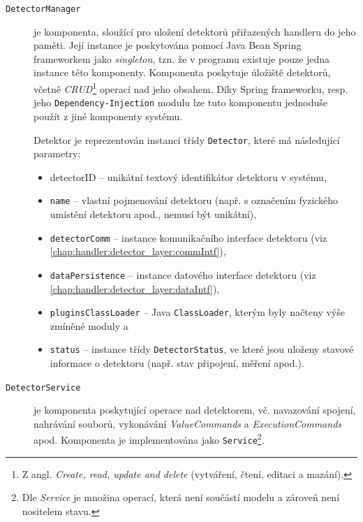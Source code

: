 \begin{description}
  \item[\texttt{DetectorManager}] je komponenta, sloužící pro uložení detektorů přiřazených handleru do jeho paměti. Její instance je poskytována pomocí Java Bean Spring frameworkem jako \textit{singleton}, tzn. že v programu existuje pouze jedna instance této komponenty. Komponenta poskytuje úložiště detektorů, včetně \textit{CRUD}\footnote{Z angl. \textit{Create, read, update and delete} (vytváření, čtení, editaci a mazání).} operací nad jeho obsahem. Díky Spring frameworku, resp. jeho \texttt{Dependency-Injection} modulu lze tuto komponentu jednoduše použít z jiné komponenty systému.
  
  Detektor je reprezentován instancí třídy \texttt{Detector}, které má následující parametry:
  \begin{itemize}
    \item \texttt{}{detectorID} -- unikátní textový identifikátor detektoru v systému,
    \item \texttt{name} -- vlastní pojmenování detektoru (např. s označením fyzického umístění detektoru apod., nemusí být unikátní),
    \item \texttt{detectorComm} -- instance komunikačního interface detektoru (viz \ref{chap:handler:detector_layer:commIntf}),
    \item \texttt{dataPersistence} -- instance datového interface detektoru (viz \ref{chap:handler:detector_layer:dataIntf}),
    \item \texttt{pluginsClassLoader} -- Java \texttt{ClassLoader}, kterým byly načteny výše zmíněné moduly a
    \item \texttt{status} -- instance třídy \texttt{DetectorStatus}, ve které jsou uloženy stavové informace o detektoru (např. stav připojení, měření apod.).
  \end{itemize}
  
  \item[\texttt{DetectorService}] je komponenta poskytující operace nad detektorem, vč. navazování spojení, nahrávání souborů, vykonávání \textit{ValueCommands} a \textit{ExecutionCommands} apod. Komponenta je implementována jako \texttt{Service}\footnote{Dle \cite{Evans-domain-driven-design} \textit{Service} je množina operací, která není součástí modelu a zároveň není nositelem stavu.}.
\end{description}


